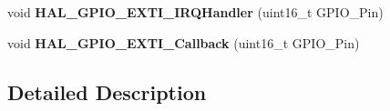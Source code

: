 \begin{DoxyCompactItemize}
\item 
\mbox{\label{group___g_p_i_o___exported___functions___group2_gaa5de1ec4ebdd47e3e2b786224adaa9d0}} 
void {\bfseries H\+A\+L\+\_\+\+G\+P\+I\+O\+\_\+\+E\+X\+T\+I\+\_\+\+I\+R\+Q\+Handler} (uint16\+\_\+t G\+P\+I\+O\+\_\+\+Pin)
\item 
\mbox{\label{group___g_p_i_o___exported___functions___group2_ga0cd91fd3a9608559c2a87a8ba6cba55f}} 
void {\bfseries H\+A\+L\+\_\+\+G\+P\+I\+O\+\_\+\+E\+X\+T\+I\+\_\+\+Callback} (uint16\+\_\+t G\+P\+I\+O\+\_\+\+Pin)
\end{DoxyCompactItemize}


\subsection{Detailed Description}
